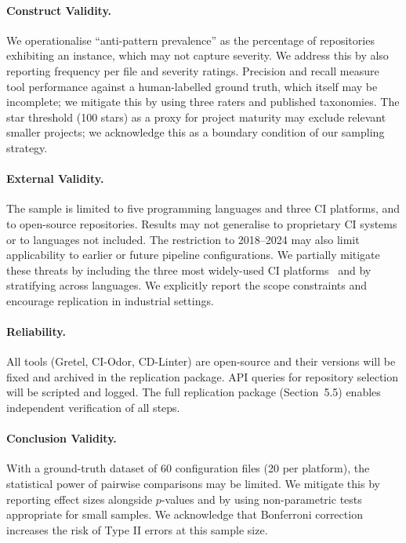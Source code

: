 \documentclass[12pt, a4paper]{article}
\begin{document}
\paragraph{Construct Validity.}
We operationalise ``anti-pattern prevalence'' as the percentage of repositories
exhibiting an instance, which may not capture severity. We address this by also
reporting frequency per file and severity ratings. Precision and recall measure tool
performance against a human-labelled ground truth, which itself may be incomplete; we
mitigate this by using three raters and published taxonomies. The star threshold (100
stars) as a proxy for project maturity may exclude relevant smaller projects; we
acknowledge this as a boundary condition of our sampling strategy.

\paragraph{External Validity.}
The sample is limited to five programming languages and three CI platforms, and to
open-source repositories. Results may not generalise to proprietary CI systems or to
languages not included. The restriction to 2018--2024 may also limit applicability
to earlier or future pipeline configurations. We partially mitigate these threats by
including the three most widely-used CI platforms~\cite{gallaba2020, kinsman2021, vassallo2020b}
and by stratifying across languages. We explicitly report the scope constraints and
encourage replication in industrial settings.

\paragraph{Reliability.}
All tools (Gretel, CI-Odor, CD-Linter) are open-source and their versions will be
fixed and archived in the replication package. API queries for repository selection
will be scripted and logged. The full replication package (Section~5.5) enables
independent verification of all steps.

\paragraph{Conclusion Validity.}
With a ground-truth dataset of 60 configuration files (20 per platform), the
statistical power of pairwise comparisons may be limited. We mitigate this by
reporting effect sizes alongside $p$-values and by using non-parametric tests
appropriate for small samples. We acknowledge that Bonferroni correction increases
the risk of Type II errors at this sample size.
\end{document}

